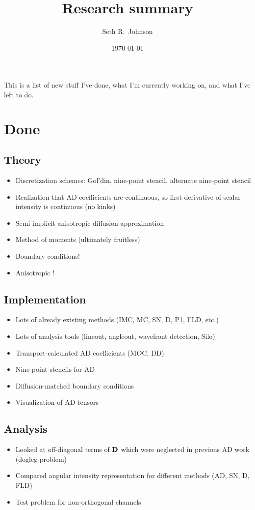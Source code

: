 \documentclass[11pt]{SRJresearch}
\author{Seth R.~Johnson}
\date{\today}
\title{Research summary}
\begin{document}
This is a list of new stuff I've done, what I'm currently working on, and what
I've left to do.

\section{Done}
\subsection{Theory}
\begin{itemize}
  \item Discretization schemes: Gol'din, nine-point stencil, alternate
    nine-point stencil
  \item Realization that AD coefficients are continuous, so first derivative of
    scalar intensity is continuous (no kinks)
  \item Semi-implicit anisotropic diffusion approximation
  \item Method of moments (ultimately fruitless)
  \item Boundary conditions!
  \item Anisotropic \APone!
\end{itemize}

\subsection{Implementation}
\begin{itemize}
  \item Lots of already existing methods (IMC, MC, SN, D, P1, FLD, etc.)
  \item Lots of analysis tools (lineout, angleout, wavefront detection, Silo)
  \item Transport-calculated AD coefficients (MOC, DD)
  \item Nine-point stencils for AD
  \item Diffusion-matched boundary conditions
  \item Visualization of AD tensors
\end{itemize}

\subsection{Analysis}
\begin{itemize}
  \item Looked at off-diagonal terms of $\mathbf{D}$ which were neglected in
    previous AD work (dogleg problem)
  \item Compared angular intensity representation for different methods (AD,
    SN, D, FLD)
  \item Test problem for non-orthogonal channels
\end{itemize}
\end{document}

